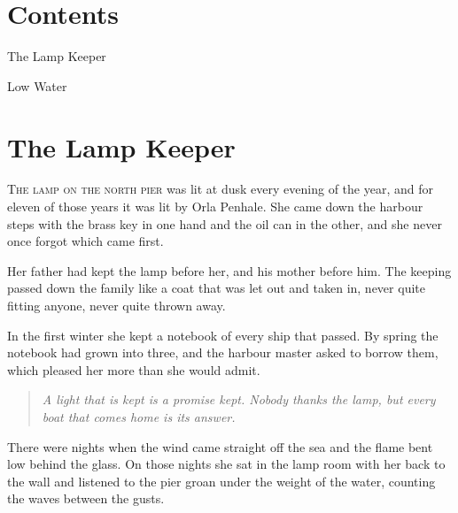 \documentclass[11pt,twoside,openright]{book}
\begin{document}
\frontmatter

\begin{titlepage}\centering\vspace*{50mm}{\Huge\bfseries The Lamp Keeper's Year\par}\end{titlepage}

\chapter*{Contents}\thispagestyle{fancy}

\quad The Lamp Keeper\dotfill\pageref{c1}\par{}\quad Low Water\dotfill\pageref{c2}\par

\mainmatter

\chapter{The Lamp Keeper}\label{c1}

\lettrine{T}{he} \textsc{lamp on the north pier} was lit at dusk every evening of the year, and for eleven of those years it was lit by Orla Penhale. She came down the harbour steps with the brass key in one hand and the oil can in the other, and she never once forgot which came first.

Her father had kept the lamp before her, and his mother before him. The keeping passed down the family like a coat that was let out and taken in, never quite fitting anyone, never quite thrown away.

In the first winter she kept a notebook of every ship that passed. By spring the notebook had grown into three, and the harbour master asked to borrow them, which pleased her more than she would admit.

\begin{quote}\itshape A light that is kept is a promise kept. Nobody thanks the lamp, but every boat that comes home is its answer.\end{quote}

There were nights when the wind came straight off the sea and the flame bent low behind the glass. On those nights she sat in the lamp room with her back to the wall and listened to the pier groan under the weight of the water, counting the waves between the gusts.
\end{document}
